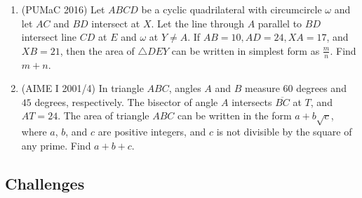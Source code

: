 \begin{enumerate}
    \item (PUMaC 2016) Let $ABCD$ be a cyclic quadrilateral with circumcircle $\omega$ and let $AC$ and $BD$ intersect at $X$. Let the line through $A$ parallel to $BD$ intersect line $CD$ at $E$ and $\omega$ at $Y \ne A$. If $AB = 10, AD = 24, XA = 17$, and $XB = 21$, then the area of $\triangle DEY$ can be written in simplest form as $\frac{m}{n}.$ Find $m + n$.
    
    \item (AIME I 2001/4) In triangle $ABC$, angles $A$ and $B$ measure $60$ degrees and $45$ degrees, respectively. The bisector of angle $A$ intersects $\overline{BC}$ at $T$, and $AT=24$. The area of triangle $ABC$ can be written in the form $a+b\sqrt{c}$, where $a$, $b$, and $c$ are positive integers, and $c$ is not divisible by the square of any prime. Find $a+b+c$.
\end{enumerate}

\subsection{Challenges}

